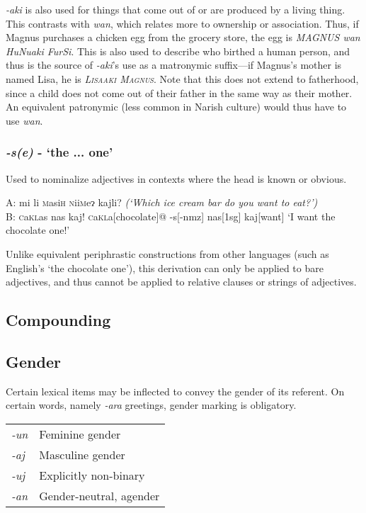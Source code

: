 \documentclass[a4paper,10pt,twoside,openright]{memoir}
\newcommand{\lilglot}{ɂ}
\newcommand{\famwordold}[5]{#1\textsc{#2}#3\textsc{#4}#5}
\newcommand\famword[1]{{\addfontfeatures{Letters=UppercaseSmallCaps}#1}}
\begin{document}
\emph{-aki} is also used for things that come out of or are produced by a living thing. This contrasts with \emph{wan}, which relates more to ownership or association. Thus, if Magnus purchases a chicken egg from the grocery store, the egg is \textit{M\famword{AGNUS wan HuNuaki FurSi}}. This is also used to describe who birthed a human person, and thus is the source of \textit{-aki}'s use as a matronymic suffix---if Magnus's mother is named Lisa, he is \textit{\textsc{Lisaaki Magnus}}. Note that this does not extend to fatherhood, since a child does not come out of their father in the same way as their mother. An equivalent patronymic (less common in Narish culture) would thus have to use \textit{wan}.

\subsubsection{\emph{-s(e)} - `the ... one'}

Used to nominalize adjectives in contexts where the head is known or obvious.

\ex
\begingl
\glpreamble
A: mi li \famwordold{}{m}{asi}{h}{} \famwordold{}{n}{ii}{m}{e\lilglot} kajli? \textit{(`Which ice cream bar do you want to eat?')}\\
B: \famwordold{}{c}{a}{kl}{as} nas kaj!%
\endpreamble
\famwordold{}{c}{a}{kl}{a}[chocolate]@
-s[\sc -nmz]
nas[\sc 1sg]
kaj[want]
\glft `I want the chocolate one!'
\endgl
\xe

Unlike equivalent periphrastic constructions from other languages (such as English's `the chocolate one'), this derivation can only be applied to bare adjectives, and thus cannot be applied to relative clauses or strings of adjectives.

\subsection{Compounding}

\subsection{Gender}

Certain lexical items may be inflected to convey the gender of its referent. On certain words, namely \emph{-ara} greetings, gender marking is obligatory.

\begin{table}[ht]
    \centering
    \begin{tabular}{>{\em}ll}
    -un & Feminine gender \\
    -aj & Masculine gender \\
    -uj & Explicitly non-binary \\
    -an & Gender-neutral, agender \\
    \end{tabular}
\end{table}
\end{document}
